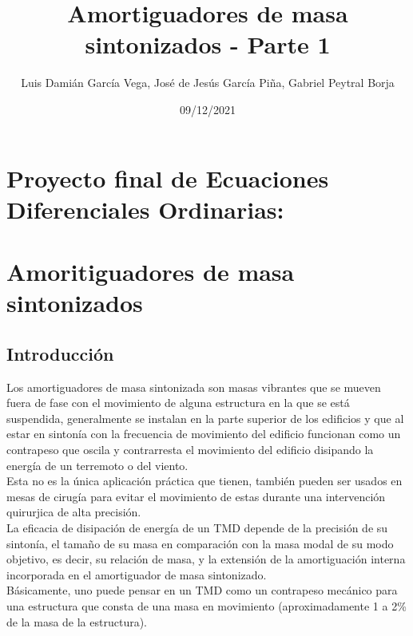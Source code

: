 \documentclass[
]{article}
\title{Amortiguadores de masa sintonizados - Parte 1}
\author{Luis Damián García Vega, José de Jesús García Piña, Gabriel
Peytral Borja}
\date{09/12/2021}
\begin{document}
\maketitle

\newcommand{\bcenter}{\begin{center}}
\newcommand{\ecenter}{\end{center}}

\begin{center}

\hypertarget{proyecto-final-de-ecuaciones-diferenciales-ordinarias}{%
\section{Proyecto final de Ecuaciones Diferenciales
Ordinarias:}\label{proyecto-final-de-ecuaciones-diferenciales-ordinarias}}

\hypertarget{amoritiguadores-de-masa-sintonizados}{%
\section{Amoritiguadores de masa
sintonizados}\label{amoritiguadores-de-masa-sintonizados}}

\end{center}

\hypertarget{introducciuxf3n}{%
\subsection{\texorpdfstring{\textbf{Introducción}}{Introducción}}\label{introducciuxf3n}}

Los amortiguadores de masa sintonizada son masas vibrantes que se mueven
fuera de fase con el movimiento de alguna estructura en la que se está
suspendida, generalmente se instalan en la parte superior de los
edificios y que al estar en sintonía con la frecuencia de movimiento del
edificio funcionan como un contrapeso que oscila y contrarresta el
movimiento del edificio disipando la energía de un terremoto o del
viento.\\
Esta no es la única aplicación práctica que tienen, también pueden ser
usados en mesas de cirugía para evitar el movimiento de estas durante
una intervención quirurjica de alta precisión.\\
La eficacia de disipación de energía de un TMD depende de la precisión
de su sintonía, el tamaño de su masa en comparación con la masa modal de
su modo objetivo, es decir, su relación de masa, y la extensión de la
amortiguación interna incorporada en el amortiguador de masa
sintonizado.\\
Básicamente, uno puede pensar en un TMD como un contrapeso mecánico para
una estructura que consta de una masa en movimiento (aproximadamente 1 a
2\% de la masa de la estructura).
\end{document}
